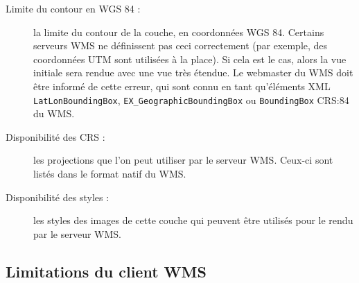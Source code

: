 \begin{itemize}[label=--]
\begin{description}
\item[Limite du contour en WGS 84 :]  la limite du contour de la couche, en coordonnées WGS 84. Certains serveurs WMS ne définissent pas ceci correctement (par exemple, des coordonnées UTM sont utilisées à la place). Si cela est le cas, alors la vue initiale sera rendue avec une vue très étendue. Le webmaster du WMS doit être informé de cette erreur, qui sont connu en tant qu'éléments XML \texttt{LatLonBoundingBox}, \texttt{EX\_GeographicBoundingBox} ou \texttt{BoundingBox} CRS:84 du WMS.

\item[Disponibilité des CRS :]  les projections que l'on peut utiliser par le serveur WMS. Ceux-ci sont listés dans le format natif du WMS.

\item[Disponibilité des styles :]  les styles des images de cette couche qui peuvent être utilisés pour le rendu par le serveur WMS.

\end{description}

\end{itemize}


\subsection{Limitations du client
WMS}\label{sec:ogc-wms-limits}

